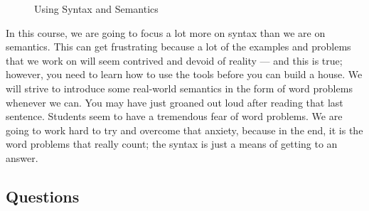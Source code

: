 \documentclass[letterpaper,12pt,fleqn]{article}
\begin{document}
\begin{figure}[h]
  \centering
  \caption*{Using Syntax and Semantics}
\end{figure}

\bigskip

In this course, we are going to focus a lot more on syntax than we are on semantics. This
can get frustrating because a lot of the examples and problems that we work on will seem
contrived and devoid of reality --- and this is true; however, you need to learn how to
use the tools before you can build a house. We will strive to introduce some real-world
semantics in the form of word problems whenever we can. You may have just groaned out
loud after reading that last sentence. Students seem to have a tremendous fear of word
problems. We are going to work hard to try and overcome that anxiety, because in the end,
it is the word problems that really count; the syntax is just a means of getting to an
answer.

\subsection*{Questions}
\end{document}
